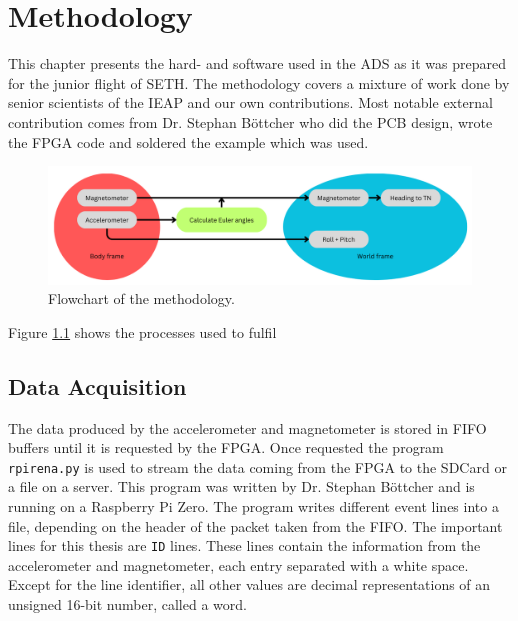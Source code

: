 \chapter{Methodology \label{ch:methodology}}
This chapter presents the hard- and software used in the \ac{ADS} as it was prepared for the junior flight of \ac{SETH}. The methodology covers a mixture of work done by senior scientists of the \ac{IEAP} and our own contributions. Most notable external contribution comes from Dr. Stephan Böttcher who did the \ac{PCB} design, wrote the \ac{FPGA} code and soldered the example which was used. 

\begin{figure}[H]
    \centering
    \includegraphics[width=0.75\linewidth]{images/02_methodology/ads_flowchart.png}
    \caption{Flowchart of the methodology.}
    \label{fig:meth:ads_flowchart}
\end{figure}

Figure \ref{fig:meth:ads_flowchart} shows the processes used to fulfil

\section{Data Acquisition \label{sec:meth:data_acquisition}}
The data produced by the accelerometer and magnetometer is stored in \ac{FIFO} buffers until it is requested by the \ac{FPGA}. Once requested the program \verb|rpirena.py| is used to stream the data coming from the \ac{FPGA} to the SD\:Card or a file on a server. This program was written by Dr. Stephan Böttcher and is running on a Raspberry Pi Zero. The program writes different event lines into a file, depending on the header of the packet taken from the \ac{FIFO}. The important lines for this thesis are \verb|ID| lines. These lines contain the information from the accelerometer and magnetometer, each entry separated with a white space. Except for the line identifier, all other values are decimal representations of an unsigned 16-bit number, called a word.

